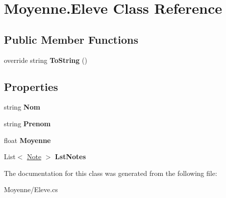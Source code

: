\hypertarget{class_moyenne_1_1_eleve}{}\section{Moyenne.\+Eleve Class Reference}
\label{class_moyenne_1_1_eleve}
\subsection*{Public Member Functions}
\begin{DoxyCompactItemize}
\item 
\mbox{\label{class_moyenne_1_1_eleve_a0004c2843368a1bbf9ce62778a49379a}} 
override string {\bfseries To\+String} ()
\end{DoxyCompactItemize}
\subsection*{Properties}
\begin{DoxyCompactItemize}
\item 
\mbox{\label{class_moyenne_1_1_eleve_a3ebbcd846ecb67e09f70d9955a458dce}} 
string {\bfseries Nom}
\item 
\mbox{\label{class_moyenne_1_1_eleve_aeef8953ec6c139263caa9acfe8ffa11c}} 
string {\bfseries Prenom}
\item 
\mbox{\label{class_moyenne_1_1_eleve_af6878eddddb9eb7247c0ddd6e49fd740}} 
float {\bfseries Moyenne}
\item 
\mbox{\label{class_moyenne_1_1_eleve_a38b165e62ba0ac45fe692a1cb2c94c02}} 
List$<$ \hyperlink{class_moyenne_1_1_note}{Note} $>$ {\bfseries Lst\+Notes}
\end{DoxyCompactItemize}


The documentation for this class was generated from the following file\+:\begin{DoxyCompactItemize}
\item 
Moyenne/Eleve.\+cs\end{DoxyCompactItemize}
